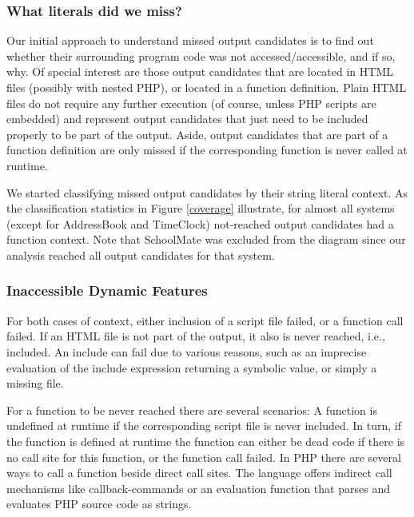 \documentclass[preprint]{sig-alternate-05-2015}
\begin{document}
\subsubsection{What literals did we miss?}\label{WhatLiteralsDidWeMiss?}
Our initial approach to understand missed output candidates is to find out whether their surrounding program code was not accessed/accessible, and if so, why. Of special interest are those output candidates that are located in HTML files (possibly with nested PHP), or located in a function definition. Plain HTML files do not require any further execution (of course, unless PHP scripts are embedded) and represent output candidates that just need to be included properly to be part of the output. Aside, output candidates that are part of a function definition are only missed if the corresponding function is never called at runtime.

We started classifying missed output candidates by their string literal context. As the classification statistics in Figure \ref{coverage} illustrate, for almost all systems (except for \textsf{AddressBook} and \textsf{TimeClock}) not-reached output candidates had a function context. Note that \textsf{SchoolMate} was excluded from the diagram since our analysis reached all output candidates for that system.

%		

\subsubsection{Inaccessible Dynamic Features}
\label{sec:inaccessible}
For both cases of context, either inclusion of a script file failed, or a function call failed. If an HTML file is not part of the output, it also is never reached, i.e., included. An include can fail due to various reasons, such as an imprecise evaluation of the include expression returning a symbolic value, or simply a missing file. 

For a function to be never reached there are several scenarios: A function is undefined at runtime if the corresponding script file is never included. In turn, if the function is defined at runtime the function can either be dead code if there is no call site for this function, or the function call failed. In PHP there are several ways to call a function beside direct call sites. The language offers indirect call mechanisms like callback-commands or an evaluation function that parses and evaluates PHP source code as strings.
\end{document}
